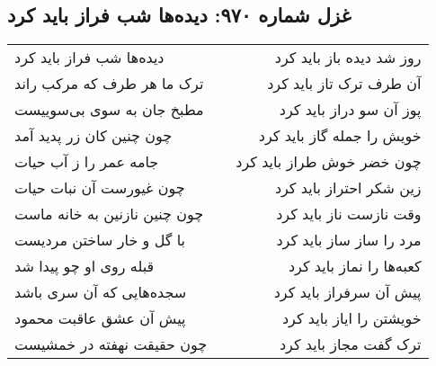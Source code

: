 \begin{center}
\section*{غزل شماره ۹۷۰: دیده‌ها شب فراز باید کرد}
\label{sec:0970}
\begin{longtable}{l p{0.5cm} r}
دیده‌ها شب فراز باید کرد
&&
روز شد دیده باز باید کرد
\\
ترک ما هر طرف که مرکب راند
&&
آن طرف ترک تاز باید کرد
\\
مطبخ جان به سوی بی‌سوییست
&&
پوز آن سو دراز باید کرد
\\
چون چنین کان زر پدید آمد
&&
خویش را جمله گاز باید کرد
\\
جامه عمر را ز آب حیات
&&
چون خضر خوش طراز باید کرد
\\
چون غیورست آن نبات حیات
&&
زین شکر احتراز باید کرد
\\
چون چنین نازنین به خانه ماست
&&
وقت نازست ناز باید کرد
\\
با گل و خار ساختن مردیست
&&
مرد را ساز ساز باید کرد
\\
قبله روی او چو پیدا شد
&&
کعبه‌ها را نماز باید کرد
\\
سجده‌هایی که آن سری باشد
&&
پیش آن سرفراز باید کرد
\\
پیش آن عشق عاقبت محمود
&&
خویشتن را ایاز باید کرد
\\
چون حقیقت نهفته در خمشیست
&&
ترک گفت مجاز باید کرد
\\
\end{longtable}
\end{center}
